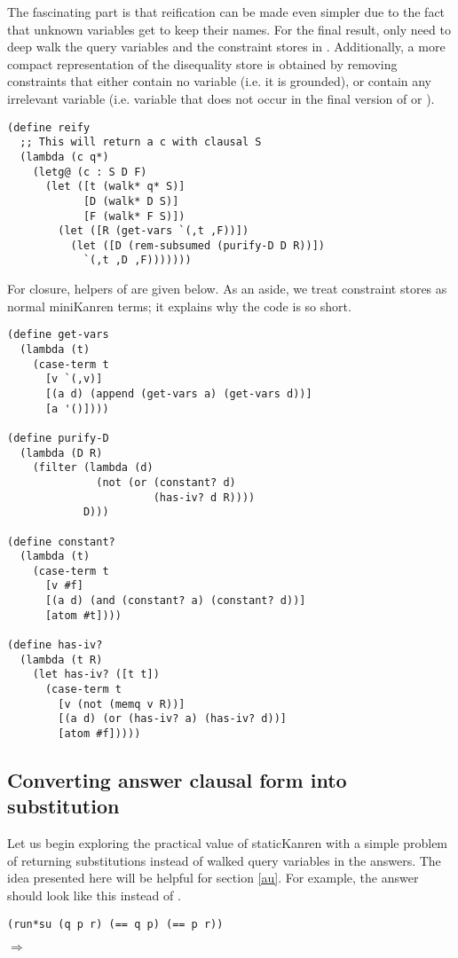 The fascinating part is that reification can be made even simpler due to the fact that unknown variables get to keep their names. For the final result,  only need to deep walk the query variables and the constraint stores in . Additionally, a more compact representation of the disequality store is obtained by removing constraints that either contain no variable (i.e. it is grounded), or contain any irrelevant variable (i.e. variable that does not occur in the final version of  or ).
\begin{lstlisting}
(define reify
  ;; This will return a c with clausal S
  (lambda (c q*)
    (letg@ (c : S D F)
      (let ([t (walk* q* S)]
            [D (walk* D S)]
            [F (walk* F S)])
        (let ([R (get-vars `(,t ,F))])
          (let ([D (rem-subsumed (purify-D D R))])
            `(,t ,D ,F)))))))
\end{lstlisting}

For closure, helpers of  are given below. As an aside, we treat constraint stores as normal miniKanren terms; it explains why the code is so short.
\begin{lstlisting}
(define get-vars
  (lambda (t)
    (case-term t
      [v `(,v)]
      [(a d) (append (get-vars a) (get-vars d))]
      [a '()])))

(define purify-D
  (lambda (D R)
    (filter (lambda (d)
              (not (or (constant? d)
                       (has-iv? d R))))
            D)))

(define constant?
  (lambda (t)
    (case-term t
      [v #f]
      [(a d) (and (constant? a) (constant? d))]
      [atom #t])))

(define has-iv?
  (lambda (t R)
    (let has-iv? ([t t])
      (case-term t
        [v (not (memq v R))]
        [(a d) (or (has-iv? a) (has-iv? d))]
        [atom #f]))))
\end{lstlisting}

\subsection{Converting answer clausal form into  substitution}\label{S}
Let us begin exploring the practical value of staticKanren with a simple problem of returning substitutions instead of walked query variables in the answers. The idea presented here will be helpful for section \ref{au}. For example, the answer should look like this instead of .
\begin{lstlisting}
(run*su (q p r) (== q p) (== p r))
\end{lstlisting}
$\Rightarrow$ 


